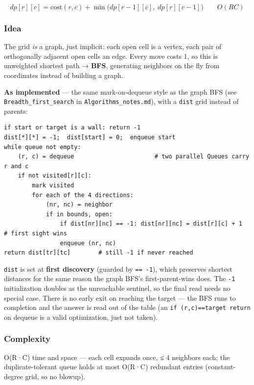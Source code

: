 \documentclass[
  10pt,
  letterpaper,
  onecolumn]{article}
\begin{document}
\begin{equation*}
dp[r][c]=\text{cost}(r,c)+\min\bigl(dp[r-1][c],\;dp[r][c-1]\bigr)
\qquad O(RC)
\end{equation*}

\hypertarget{idea-17}{%
\subsubsection{Idea}\label{idea-17}}

The grid \emph{is} a graph, just implicit: each open cell is a vertex,
each pair of orthogonally adjacent open cells an edge. Every move costs
1, so this is unweighted shortest path → \textbf{BFS}, generating
neighbors on the fly from coordinates instead of building a graph.

\textbf{As implemented} --- the same mark-on-dequeue style as the graph
BFS (see \texttt{Breadth\_first\_search} in
\texttt{Algorithms\_notes.md}), with a \texttt{dist} grid instead of
parents:

\begin{verbatim}
if start or target is a wall: return -1
dist[*][*] = -1;  dist[start] = 0;  enqueue start
while queue not empty:
    (r, c) = dequeue                       # two parallel Queues carry r and c
    if not visited[r][c]:
        mark visited
        for each of the 4 directions:
            (nr, nc) = neighbor
            if in bounds, open:
                if dist[nr][nc] == -1: dist[nr][nc] = dist[r][c] + 1   # first sight wins
                enqueue (nr, nc)
return dist[tr][tc]        # still -1 if never reached
\end{verbatim}

\texttt{dist} is set at \textbf{first discovery} (guarded by
\texttt{==\ -1}), which preserves shortest distances for the same reason
the graph BFS's first-parent-wins does. The \texttt{-1} initialization
doubles as the unreachable sentinel, so the final read needs no special
case. There is no early exit on reaching the target --- the BFS runs to
completion and the answer is read out of the table (an
\texttt{if\ (r,c)==target\ return} on dequeue is a valid optimization,
just not taken).

\hypertarget{complexity-17}{%
\subsubsection{Complexity}\label{complexity-17}}

O(R·C) time and space --- each cell expands once, ≤ 4 neighbors each;
the duplicate-tolerant queue holds at most O(R·C) redundant entries
(constant-degree grid, so no blowup).
\end{document}
